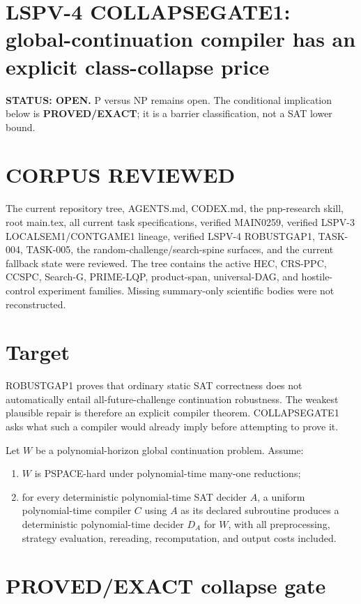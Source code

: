 \documentclass[11pt]{article}
\begin{document}
\section*{LSPV-4 COLLAPSEGATE1: global-continuation compiler has an explicit class-collapse price}
\textbf{STATUS: OPEN.} P versus NP remains open. The conditional implication below is \textbf{PROVED/EXACT}; it is a barrier classification, not a SAT lower bound.

\section*{CORPUS REVIEWED}
The current repository tree, AGENTS.md, CODEX.md, the pnp-research skill, root main.tex, all current task specifications, verified MAIN0259, verified LSPV-3 LOCALSEM1/CONTGAME1 lineage, verified LSPV-4 ROBUSTGAP1, TASK-004, TASK-005, the random-challenge/search-spine surfaces, and the current fallback state were reviewed. The tree contains the active HEC, CRS-PPC, CCSPC, Search-G, PRIME-LQP, product-span, universal-DAG, and hostile-control experiment families. Missing summary-only scientific bodies were not reconstructed.

\section*{Target}
ROBUSTGAP1 proves that ordinary static SAT correctness does not automatically entail all-future-challenge continuation robustness. The weakest plausible repair is therefore an explicit compiler theorem. COLLAPSEGATE1 asks what such a compiler would already imply before attempting to prove it.

Let \(W\) be a polynomial-horizon global continuation problem. Assume:
\begin{enumerate}
\item \(W\) is PSPACE-hard under polynomial-time many-one reductions;
\item for every deterministic polynomial-time SAT decider \(A\), a uniform polynomial-time compiler \(C\) using \(A\) as its declared subroutine produces a deterministic polynomial-time decider \(D_A\) for \(W\), with all preprocessing, strategy evaluation, rereading, recomputation, and output costs included.
\end{enumerate}

\section*{PROVED/EXACT collapse gate}
\end{document}
